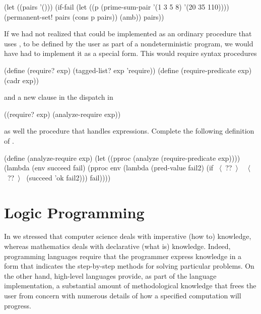 \begin{exerciseGroup}
\begin{codeBlock}
(let ((pairs '()))
  (if-fail
   (let ((p (prime-sum-pair '(1 3 5 8)
                            '(20 35 110))))
     (permanent-set! pairs (cons p pairs))
     (amb))
   pairs))
\end{codeBlock}

\label{Exercise 4.54}
 If we had not realized that
 could be implemented as an ordinary procedure that uses
, to be defined by the user as part of a nondeterministic program, we
would have had to implement it as a special form.  This would require syntax
procedures

\begin{codeBlock}
(define (require? exp)
  (tagged-list? exp 'require))
(define (require-predicate exp)
  (cadr exp))
\end{codeBlock}

\noindent
and a new clause in the dispatch in 

\begin{codeBlock}
((require? exp) (analyze-require exp))
\end{codeBlock}

\noindent
as well the procedure  that handles 
expressions.  Complete the following definition of .

\begin{codeBlock}
(define (analyze-require exp)
  (let ((pproc (analyze (require-predicate exp))))
    (lambda (env succeed fail)
      (pproc env
             (lambda (pred-value fail2)
               (if ~\(\langle \)~??~\(\rangle \)~
                   ~\(\langle \)~??~\(\rangle \)~
                   (succeed 'ok fail2)))
             fail))))

\end{codeBlock}
\end{exerciseGroup}


\section{Logic Programming}
\label{Section 4.4}

In  we stressed that computer science deals with imperative (how
to) knowledge, whereas mathematics deals with declarative (what is) knowledge.
Indeed, programming languages require that the programmer express knowledge in
a form that indicates the step-by-step methods for solving particular problems.
On the other hand, high-level languages provide, as part of the language
implementation, a substantial amount of methodological knowledge that frees the
user from concern with numerous details of how a specified computation will
progress.

